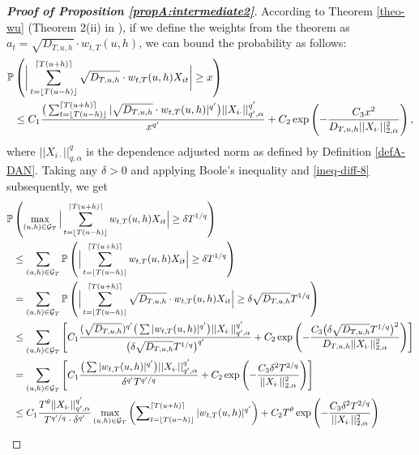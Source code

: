 \begin{proof}[\textnormal{\textbf{Proof of Proposition \ref{propA:intermediate2}}}]
According to Theorem \ref{theo-wu} (Theorem 2(ii) in \cite{Wu2016}), if we define the weights from the theorem as $a_t = \sqrt{D_{T, u, h}}\cdot w_{t,T}(u,h)$, we can bound the probability as follows:
\begin{align}\label{ineq-diff-8}
\begin{split}
\mathbb{P}&\left(\bigg| \sum_{t=\lfloor T(u-h) \rfloor}^{\lceil T(u+h) \rceil} \sqrt{D_{T, u, h}}\cdot w_{t,T}(u,h)X_{it}  \bigg| \geq x\right) \\
&\leq C_1 \frac{\big( \sum_{t=\lfloor T(u-h) \rfloor}^{\lceil T(u+h) \rceil} |\sqrt{D_{T, u, h}}\cdot w_{t,T}(u,h)|^{q^\prime}\big) ||X_{i\cdot}||^{q^\prime}_{q^\prime, \alpha}}{ x^{q^\prime}} + C_2 \exp \left(-\frac{C_3  x^2}{D_{T, u, h}||X_{i\cdot}||^{2}_{2, \alpha}}\right),
\end{split}
\end{align}
where $||X_{i\cdot}||^{q}_{q, \alpha}$ is the dependence adjusted norm as defined by Definition \ref{defA-DAN}. Taking any $\delta>0$ and applying Boole's inequality and \eqref{ineq-diff-8} subsequently, we get
{\color{red}\begin{align*}
\pr&\left(\max_{(u, h) \in \mathcal{G}_T} \Big| \sum_{t=\lfloor T(u-h) \rfloor}^{\lceil T(u+h) \rceil} w_{t,T}(u,h)X_{it}  \Big| \geq \delta T^{1/q} \right) \\
&\leq \sum_{(u, h) \in \mathcal{G}_T} \pr \left( \Big| \sum_{t=\lfloor T(u-h) \rfloor}^{\lceil T(u+h) \rceil} w_{t,T}(u,h)X_{it}  \Big| \geq \delta T^{1/q} \right) \\
&= \sum_{(u, h) \in \mathcal{G}_T} \pr \left( \Big| \sum_{t=\lfloor T(u-h) \rfloor}^{\lceil T(u+h) \rceil} \sqrt{D_{T, u, h}}\cdot w_{t,T}(u,h)X_{it}  \Big| \geq \delta\sqrt{D_{T, u, h}}T^{1/q}  \right)  \\
&\leq \sum_{(u, h) \in \mathcal{G}_T} \left[C_1 \frac{(\sqrt{D_{T, u, h}})^{q^\prime}\big( \sum |w_{t,T}(u,h)|^{q^\prime}\big) ||X_{i\cdot}||^{q^\prime}_{q^\prime, \alpha}}{ \big(\delta\sqrt{D_{T, u, h}}T^{1/q}\big)^{q^\prime}} + C_2 \exp \left(-\frac{C_3 \big(\delta\sqrt{D_{T, u, h}}T^{1/q} \big)^2}{D_{T, u, h}||X_{i\cdot}||^{2}_{2, \alpha}}\right) \right] \\
&= \sum_{(u, h) \in \mathcal{G}_T} \left[C_1 \frac{\big( \sum |w_{t,T}(u,h)|^{q^\prime}\big) ||X_{i\cdot}||^{q^\prime}_{q^\prime, \alpha}}{\delta^{q^\prime}T^{q^\prime/q} } + C_2 \exp \left(-\frac{C_3 \delta^2 T^{2/q} }{||X_{i\cdot}||^{2}_{2, \alpha}}\right) \right] \\
&\leq C_1 \frac{ T^\theta ||X_{i\cdot}||^{q^\prime}_{q^\prime, \alpha}}{T^{q^\prime/q}\cdot \delta^{q^\prime}} \max_{(u, h) \in \mathcal{G}_T} \left( \sum\nolimits_{t=\lfloor T(u-h) \rfloor}^{\lceil T(u+h) \rceil} |w_{t,T}(u,h)|^{q^\prime}\right)+ C_2 T^\theta \exp \left(-\frac{C_3 \delta^2 T^{2/q}}{||X_{i\cdot}||^{2}_{2, \alpha}}\right) \\

\end{align*}}
\end{proof}
